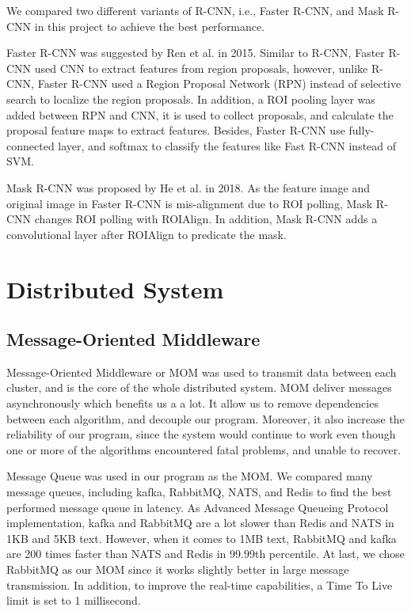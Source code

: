 \documentclass[runningheads]{llncs}
\begin{document}
We compared two different variants of R-CNN, i.e., 
Faster R-CNN, and Mask R-CNN in this project to achieve the 
best performance. 

Faster R-CNN\cite{FasterRCNN} was suggested by Ren et al. 
in 2015. Similar to R-CNN, Faster R-CNN used CNN to extract 
features from region proposals, however, unlike R-CNN, 
Faster R-CNN used a Region Proposal Network (RPN) instead 
of selective search to localize the region proposals. In 
addition, a ROI pooling layer was added between RPN and CNN, 
it is used to collect proposals, and calculate the proposal 
feature maps to extract features. Besides, Faster R-CNN use 
fully-connected layer, and softmax to classify the features 
like Fast R-CNN instead of SVM. 

Mask R-CNN\cite{MaskRCNN} was proposed by He et al. in 2018. 
As the feature image and original image in Faster R-CNN is 
mis-alignment due to ROI polling, Mask R-CNN changes ROI 
polling with ROIAlign. In addition, Mask R-CNN adds a 
convolutional layer after ROIAlign to predicate the mask. 


\section{Distributed System}

\subsection{Message-Oriented Middleware}
Message-Oriented Middleware or MOM was used to transmit 
data between each cluster, and is the core of the whole 
distributed system. MOM deliver messages asynchronously 
which benefits us a a lot. It allow us to remove 
dependencies between each algorithm, and decouple our 
program. Moreover, it also increase the reliability of our 
program, since the system would continue to work even 
though one or more of the algorithms encountered fatal 
problems, and unable to recover.

Message Queue was used in our program as the MOM. We 
compared many message queues, including kafka, RabbitMQ, 
NATS, and Redis to find the best performed message queue 
in latency. As Advanced Message Queueing Protocol 
implementation, kafka and RabbitMQ are a lot slower than 
Redis and NATS in 1KB and 5KB text. However, when it comes
to 1MB text, RabbitMQ and kafka are 200 times faster than 
NATS and Redis in 99.99th percentile. At last, we chose 
RabbitMQ as our MOM since it works slightly better in large 
message transmission. In addition, to improve the real-time 
capabilities, a Time To Live limit is set to 1 millisecond.
\end{document}
